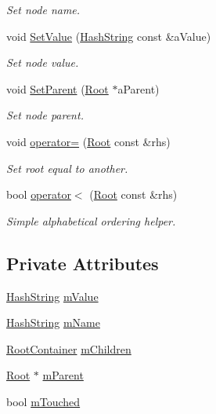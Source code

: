 \begin{DoxyCompactItemize}
\begin{DoxyCompactList}\small\item\em Set node name. \end{DoxyCompactList}\item 
void \hyperlink{classRoot_aa5207f1e090f6d1dc6f01dbe14719142}{Set\+Value} (\hyperlink{classHashString}{Hash\+String} const \&a\+Value)
\begin{DoxyCompactList}\small\item\em Set node value. \end{DoxyCompactList}\item 
void \hyperlink{classRoot_a49bbcc48492c04d814ea2a89c35e861f}{Set\+Parent} (\hyperlink{classRoot}{Root} $\ast$a\+Parent)
\begin{DoxyCompactList}\small\item\em Set node parent. \end{DoxyCompactList}\item 
void \hyperlink{classRoot_a45147d14cfd657da6d34d0a05826c7fc}{operator=} (\hyperlink{classRoot}{Root} const \&rhs)
\begin{DoxyCompactList}\small\item\em Set root equal to another. \end{DoxyCompactList}\item 
bool \hyperlink{classRoot_a5f52ecd89f4db33d293d02eb5548bc95}{operator$<$} (\hyperlink{classRoot}{Root} const \&rhs)
\begin{DoxyCompactList}\small\item\em Simple alphabetical ordering helper. \end{DoxyCompactList}\end{DoxyCompactItemize}
\subsection*{Private Attributes}
\begin{DoxyCompactItemize}
\item 
\hyperlink{classHashString}{Hash\+String} \hyperlink{classRoot_a02e28eb3c3fac3185f408446b30b5b77}{m\+Value}
\item 
\hyperlink{classHashString}{Hash\+String} \hyperlink{classRoot_adc6338ef170b1c0e07c6e50bd0571515}{m\+Name}
\item 
\hyperlink{Root_8h_aba37b6ece0d9fb5495482ccd0e0f272e}{Root\+Container} \hyperlink{classRoot_aface52589cb6e6e464ab70d90d3dc807}{m\+Children}
\item 
\hyperlink{classRoot}{Root} $\ast$ \hyperlink{classRoot_af38e126b7b80124a9ca0d0c1f3076f2d}{m\+Parent}
\item 
bool \hyperlink{classRoot_ad85ad4d959d7808ce715802dbaea51e8}{m\+Touched}
\end{DoxyCompactItemize}


